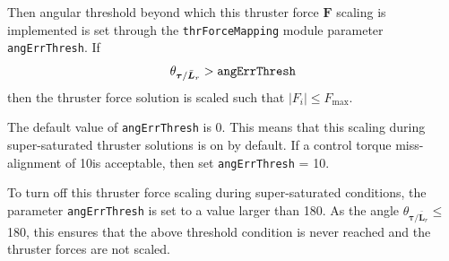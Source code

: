 Then angular threshold beyond which this thruster force $\bm F$ scaling is implemented is set through the  {\tt thrForceMapping} module parameter {\tt angErrThresh}.  If 
$$
	\theta_{\bm\tau/\bar{\bm L}_{r}} > \text{\tt angErrThresh}
$$
then the thruster force solution is scaled such that $|F_{i}| \le F_{\text{max}}$.  

The default value of {\tt angErrThresh} is 0\dg.  This means that this scaling during super-saturated thruster solutions is on by default.  If a control torque miss-alignment of 10\dg is acceptable, then set {\tt angErrThresh} = 10\dg.  

To turn off this thruster force scaling during super-saturated conditions, the parameter  {\tt angErrThresh} is set to a value larger than 180\dg.  As the angle $\theta_{\bm\tau/\bar{\bm L}_{r}} \le $180\dg, this ensures that the above threshold condition is never reached and the thruster forces are not scaled.  


